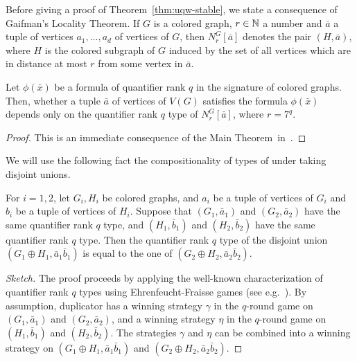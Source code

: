 Before giving a proof of Theorem~\ref{thm:uqw-stable},
we state a consequence of Gaifman's Locality Theorem.
 If $G$ is a colored graph, $r\in\mathbb{N}$  a number and $\bar a$ a tuple of vertices $a_1,\ldots,a_d$  of vertices of $G$, then  $N^G_r[\bar a]$ denotes the pair $(H,\bar a)$, where $H$ is the colored subgraph of $G$
induced by the set of all vertices which are in distance at most $r$
from some vertex in $\bar a$.

\begin{lemma}\label{lem:gaifman}
	Let $\phi(\bar x)$ be a  formula 
	of quantifier rank $q$
	in the signature of colored graphs. 	Then, whether a tuple $\bar a$ of vertices of $V(G)$
	satisfies the formula $\phi(\bar x)$
	depends only on the quantifier rank $q$ type of  $N^G_r[\bar a]$,
 where $r=7^q$.
\end{lemma}
\begin{proof}This is an immediate consequence of the Main Theorem~in~\cite{gaifman1982local}.
\end{proof}
We will use the following fact the compositionality of types of 
under taking disjoint unions.
		\begin{lemma}\label{lem:type-union}
			For $i=1,2$, let $G_i,H_i$ be colored graphs,
			and $a_i$ be a tuple of vertices of $G_i$
			and $b_i$ be a tuple of vertices of $H_i$.
			Suppose that $(G_1,\bar a_1)$ and $(G_2,\bar a_2)$ 
			have the same quantifier rank $q$ type,
			and $(H_1,\bar b_1)$ and $(H_2,\bar b_2)$ 
			have the same quantifier rank $q$ type.			
			Then the quantifier rank $q$ type of the disjoint union 
			$(G_1\oplus H_1,\bar a_1\bar b_1)$ is equal to the one of $(G_2\oplus H_2,\bar a_2\bar b_2)$. \end{lemma}
\begin{proof}[Sketch]
	The proof proceeds by applying the well-known characterization 
	of quantifier rank $q$  types using Ehrenfeucht-Fraisse games (see e.g.~\cite{libkin}). By assumption, duplicator has a winning strategy $\gamma$ in the $q$-round game on $(G_1,\bar a_1)$ and $(G_2,\bar a_2)$, and a winning strategy $\eta$ in the $q$-round game on $(H_1,\bar b_1)$ and $(H_2,\bar b_2)$. The strategies $\gamma$ and $\eta$ can be combined into a winning strategy on $(G_1\oplus H_1,\bar a_1\bar b_1)$ and $(G_2\oplus H_2,\bar a_2\bar b_2)$.
\end{proof}


